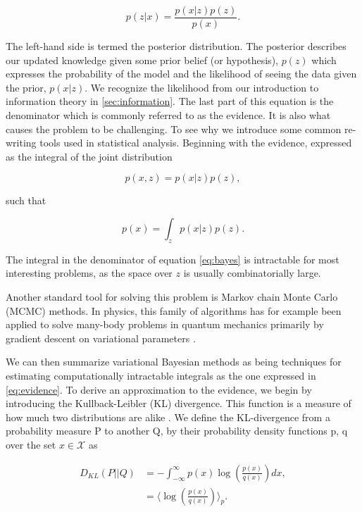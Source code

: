  \begin{equation}\label{eq:bayes}
 p(z| x) = \frac{p(x|z) p(z)}{p(x)}.
 \end{equation}

 \noindent The left-hand side is termed the posterior distribution. The posterior describes our updated knowledge given some prior belief (or hypothesis), $p(z)$ which expresses the probability of the model and the likelihood of seeing the data given the prior, $p(x|z)$. We recognize the likelihood from our introduction to information theory in \ref{sec:information}. The last part of this equation is the denominator which is commonly referred to as the evidence. It is also what causes the problem to be challenging. To see why we introduce some common re-writing tools used in statistical analysis. Beginning with the evidence, expressed as the integral of the joint distribution 

\begin{equation}
p(x, z) = p(x|z)p(z),
\end{equation}

\noindent such that

\begin{equation}\label{eq:evidence}
p(x) = \int_z p(x|z)p(z).
\end{equation}

\noindent The integral in the denominator of equation \ref{eq:bayes} is intractable for most interesting problems, as the space over $z$ is usually combinatorially large. 

Another standard tool for solving this problem is Markov chain Monte Carlo (MCMC) methods. In physics, this family of algorithms has for example been applied to solve many-body problems in quantum mechanics primarily by gradient descent on variational parameters \cite{Hjorth-Jensen}.

We can then summarize variational Bayesian methods as being techniques for estimating computationally intractable integrals as the one expressed in \ref{eq:evidence}. To derive an approximation to the evidence, we begin by introducing the Kullback-Leibler (KL) divergence. This function is a measure of how much two distributions are alike \cite{Kullback1951}. We define the KL-divergence from a probability measure P to another Q, by their probability density functions p, q over the set $x \in \mathcal{X}$ as

\begin{align}\label{eq:kl}
D_{KL} (P || Q) &= - \int^{\infty}_{-\infty} p(x) \log \left(\frac{p(x)}{q(x)}\right) dx, \\
&= \langle \log \left(\frac{p(x)}{q(x)} \right)\rangle_{p}.
\end{align}

